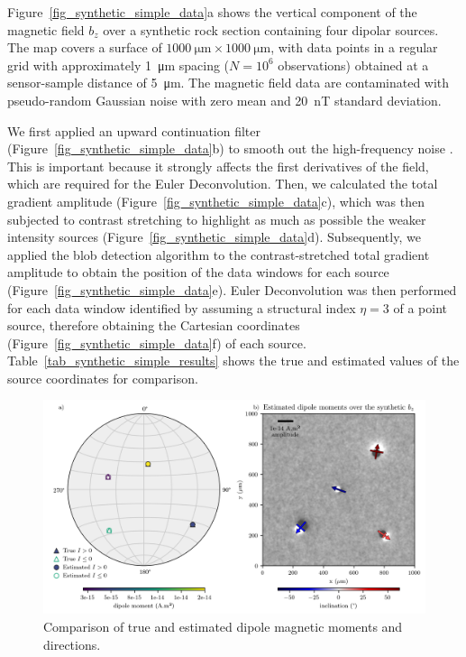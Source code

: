 Figure~\ref{fig_synthetic_simple_data}a shows the vertical component of the magnetic field $b_z$ over a synthetic rock section containing four dipolar sources.
The map covers a surface of $\qty{1000}{\um} \times \qty{1000}{\um}$, with data points in a regular grid with approximately \qty{1}{\um} spacing ($N = 10^6$ observations) obtained at a sensor-sample distance of \qty{5}{\um}.
The magnetic field data are contaminated with pseudo-random Gaussian noise with zero mean and \qty{20}{\nano\tesla} standard deviation.

We first applied an upward continuation filter (Figure~\ref{fig_synthetic_simple_data}b) to smooth out the high-frequency noise \citep{Blakely1996}.
This is important because it strongly affects the first derivatives of the field, which are required for the Euler Deconvolution.
Then, we calculated the total gradient amplitude (Figure~\ref{fig_synthetic_simple_data}c), which was then subjected to contrast stretching to highlight as much as possible the weaker intensity sources (Figure~\ref{fig_synthetic_simple_data}d).
Subsequently, we applied the blob detection algorithm to the contrast-stretched total gradient amplitude to obtain the position of the data windows for each source (Figure~\ref{fig_synthetic_simple_data}e).
Euler Deconvolution was then performed for each data window identified by assuming a structural index $\eta = 3$ of a point source, therefore obtaining the Cartesian coordinates (Figure~\ref{fig_synthetic_simple_data}f) of each source. Table~\ref{tab_synthetic_simple_results} shows the true and estimated values of the source coordinates for comparison.

\begin{figure}[tb!]
\centering
\includegraphics[width=\linewidth]{figures/simple-synthetic-dipole-moment.png}
\caption{
Comparison of true and estimated dipole magnetic moments and directions.
}
\label{fig_synthetic_simple_results}
\end{figure}

